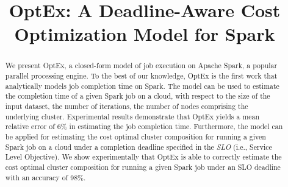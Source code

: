 \documentclass[conference]{IEEEtran}
\begin{document}
\title{OptEx: A Deadline-Aware Cost Optimization Model for Spark}

\author{
}









\maketitle
\thispagestyle{plain}
\pagestyle{plain}

\begin{abstract}
We present OptEx, a closed-form model of job execution on Apache
 Spark, a popular parallel processing engine. To the best of our knowledge,
 OptEx is the first work that analytically models job completion time on Spark. The model can be used to estimate the completion time of a given Spark job on a cloud, with respect to the size of the input dataset, the number of iterations, the number of nodes comprising the underlying cluster.
  Experimental results demonstrate that OptEx yields
a mean relative error of 6\%
in estimating the job completion time.  Furthermore, the model can be applied for estimating
  the cost optimal cluster composition for running a given Spark job on a cloud under a completion deadline
  specified in the  \emph{SLO} (i.e., Service Level Objective). We show experimentally that OptEx is able to correctly
  estimate the cost optimal cluster composition for running a given Spark job under an SLO deadline with
  an accuracy of 98\%.  \end{abstract}





\IEEEpeerreviewmaketitle
\end{document}
